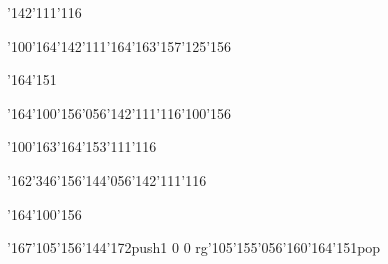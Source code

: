 \null\vfill\ipa\centerline{\enskip\enskip\enskip\enskip\enskip\enskip\enskip\char'142\char'111\char'116}\medskip\centerline{\enskip\char'100\char'164\enskip\enskip\enskip\char'142\char'111\char'164\enskip\enskip\enskip\enskip\enskip\char'163\char'157\char'125\char'156\enskip\enskip\enskip\enskip}\medskip\centerline{\enskip\enskip\enskip\enskip\enskip\enskip\enskip\enskip\enskip\enskip\enskip\char'164\char'151\enskip\enskip\enskip\enskip}\medskip\centerline{\enskip\char'164\char'100\char'156\char'056\char'142\char'111\char'116\enskip\char'100\char'156\enskip\enskip\enskip\enskip\enskip\enskip}\medskip\centerline{\enskip\char'100\char'163\char'164\enskip\enskip\enskip\char'153\char'111\char'116\enskip\enskip\enskip\enskip}\medskip\centerline{\enskip\enskip\enskip\enskip\enskip\char'162\char'346\char'156\char'144\char'056\char'142\char'111\char'116\enskip\enskip\enskip\enskip}\medskip\centerline{\enskip\enskip\enskip\enskip\enskip\enskip\enskip\char'164\char'100\char'156\enskip\enskip\enskip\enskip}\medskip\centerline{\enskip\enskip\enskip\enskip\enskip\char'167\char'105\char'156\char'144\char'172\enskip\enskip\enskip\enskip\pdfcolorstack\match push{1 0 0 rg}\char'105\char'155\char'056\char'160\char'164\char'151\pdfcolorstack\match pop{}}\medskip\vfill\footline{\hfil\tt\folio\hfil}\eject\bye